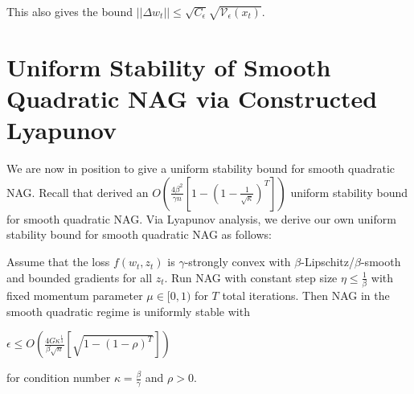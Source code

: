 \documentclass[twoside,11pt]{article}
\begin{document}
\noindent
This also gives the bound $||\Delta w_t|| \leq \sqrt{C_{\epsilon}}\sqrt{\mathcal{V}_{\epsilon}(x_t)}$.

\section{Uniform Stability of Smooth Quadratic NAG via Constructed Lyapunov}

We are now in position to give a uniform stability bound for smooth quadratic NAG. Recall that \cite{CJY18} derived an $O(\frac{4\beta^2}{\gamma n}[1-(1 - \frac{1}{\sqrt{\kappa}})^T])$ uniform stability bound for smooth quadratic NAG. Via Lyapunov analysis, we derive our own uniform stability bound for smooth quadratic NAG as follows:

\begin{theorem}
Assume that the loss $f(w_t, z_t)$ is $\gamma$-strongly convex with $\beta$-Lipschitz/$\beta$-smooth and bounded gradients for all $z_t$. Run NAG with constant step size $\eta \leq \frac{1}{\beta}$ with fixed momentum parameter $\mu \in [0,1)$ for $T$ total iterations. Then NAG in the smooth quadratic regime is uniformly stable with

\begin{center}
$\epsilon \leq O(\frac{4G\kappa^{\frac{1}{4}}}{\beta \sqrt{n}}[\sqrt{1-(1-\rho)^T}])$
\end{center}

\noindent
for condition number $\kappa = \frac{\beta}{\gamma}$ and $\rho > 0$.
\end{theorem}
\end{document}
